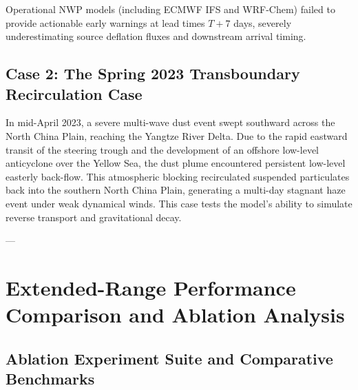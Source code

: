 Operational NWP models (including ECMWF IFS and WRF-Chem) failed to provide actionable early warnings at lead times $T+7$ days, severely underestimating source deflation fluxes and downstream arrival timing.

\subsection{Case 2: The Spring 2023 Transboundary Recirculation Case}
\label{subsec:case2_spring2023}

In mid-April 2023, a severe multi-wave dust event swept southward across the North China Plain, reaching the Yangtze River Delta. Due to the rapid eastward transit of the steering trough and the development of an offshore low-level anticyclone over the Yellow Sea, the dust plume encountered persistent low-level easterly back-flow. This atmospheric blocking recirculated suspended particulates back into the southern North China Plain, generating a multi-day stagnant haze event under weak dynamical winds. This case tests the model's ability to simulate reverse transport and gravitational decay.

---

\section{Extended-Range Performance Comparison and Ablation Analysis}
\label{sec:extended_performance}

\subsection{Ablation Experiment Suite and Comparative Benchmarks}
\label{subsec:ablation_experiments}

